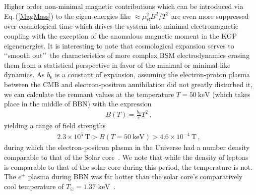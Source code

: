 \documentclass[universe,article,submit,moreauthors,pdftex,a4paper]{Definitions/mdpi}
\newcommand{\keV}{\text{ keV}}
\newcommand{\req}[1]{Eq.\,(\ref{#1})}
\begin{document}
Higher order non-minimal magnetic contributions which can be introduced via \req{MagMass} to the eigen-energies like $\approx\mu_{B}^{2}B^{2}/T^{2}$ are even more suppressed over cosmological time which drives the system into minimal electromagnetic coupling with the exception of the anomalous magnetic moment in the KGP eigenenergies. It is interesting to note that cosmological expansion serves to \lq\lq smooth out\rq\rq\ the characteristics of more complex BSM electrodynamics erasing them from a statistical perspective in favor of the minimal or minimal-like dynamics. As $b_0$ is a constant of expansion, assuming the electron-proton plasma between the CMB and electron-positron annihilation did not greatly disturbed it, we can calculate the remnant values at the temperature $T=50\ \mathrm{keV}$ (which takes place in the middle of BBN) with the expression
\begin{align}
 \label{BBNFields} B(T)=\frac{b_{0}}{e}T^{2}\,,
\end{align}
yielding a range of field strengths
\begin{align}
 \label{BBNRange} 2.3\times10^{5}\ \mathrm{T}>B(T=50\ \mathrm{keV})>4.6\times10^{-4}\ \mathrm{T}\,,
\end{align}
during which the electron-positron plasma in the Universe had a number density comparable to that of the Solar core~\cite{Bahcall:2000nu}. We note that while the density of leptons is comparable to that of the solar core during this period, the temperature is not. The $e^{\pm}$ plasma during BBN was far hotter than the solar core's comparatively cool temperature of $T_{\odot}=1.37\keV$~\cite{Castellani:1996cm}.

\end{document}

